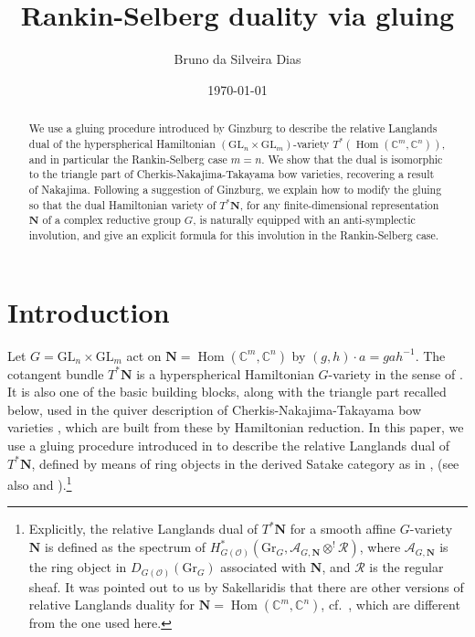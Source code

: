 \documentclass[11pt]{article}
\author{Bruno da Silveira Dias}
\title{Rankin-Selberg duality via gluing}
\date{\today}
\theoremstyle{definition}
\theoremstyle{plain}
\theoremstyle{remark}
\newcommand{\GL}{\mathrm{GL}}
\newcommand{\numberset}{\mathbb}
\newcommand{\C}{\numberset{C}}
\DeclareMathOperator{\Hom}{Hom}
\begin{document}
	
	\maketitle
    \begin{abstract}
        We use a gluing procedure introduced by Ginzburg to describe the relative Langlands dual of the hyperspherical Hamiltonian $(\GL_n \times \GL_m)$-variety $T^*(\Hom(\C^m,\C^n))$, and in particular the Rankin-Selberg case $m=n$. We show that the dual is isomorphic to the triangle part of Cherkis-Nakajima-Takayama bow varieties, recovering a result of Nakajima. Following a suggestion of Ginzburg, we explain how to modify the gluing so that the dual Hamiltonian variety of $T^*\mathbf{N}$, for any finite-dimensional representation $\mathbf{N}$ of a complex reductive group $G$, is naturally equipped with an anti-symplectic involution, and give an explicit formula for this involution in the Rankin-Selberg case.
    \end{abstract}

    
    \section{Introduction}\label{section-intro}
        
        Let $G = \GL_n \times \GL_m$ act on $\mathbf{N} = \Hom(\C^m,\C^n)$ by $(g,h) \cdot a = gah^{-1}$. The cotangent bundle $T^*\mathbf{N}$ is a hyperspherical Hamiltonian $G$-variety in the sense of \cite{benzvi2024relativelanglandsduality}. It is also one of the basic building blocks, along with the triangle part recalled below, used in the quiver description of Cherkis-Nakajima-Takayama bow varieties \cite{NakajimaTakayama2017}, which are built from these by Hamiltonian reduction. In this paper, we use a gluing procedure introduced in \cite{ginzburg2025pointwisepurityderivedsatake} to describe the relative Langlands dual of $T^*\mathbf{N}$, defined by means of ring objects in the derived Satake category as in \cite[Section 5]{BFN-Ring}, \cite[Section 8]{benzvi2024relativelanglandsduality} (see also \cite{BF2019} and \cite{nakajima2024sdualhamiltonianmathbfg}).\footnote{
            Explicitly, the relative Langlands dual of $T^*\mathbf{N}$ for a smooth affine $G$-variety $\mathbf{N}$ is defined as the spectrum of $H^*_{G(\mathcal{O})}(\mathrm{Gr}_G, \mathcal{A}_{G,\mathbf{N}} \otimes^! \mathcal{R})$, where $\mathcal{A}_{G,\mathbf{N}}$ is the ring object in $D_{G(\mathcal{O})}(\mathrm{Gr}_G)$ associated with $\mathbf{N}$, and $\mathcal{R}$ is the regular sheaf. It was pointed out to us by Sakellaridis that there are other versions of relative Langlands duality for $\mathbf{N} = \Hom(\C^m,\C^n)$, cf.\ \cite{MWZ26}, which are different from the one used here.
        }
\end{document}
